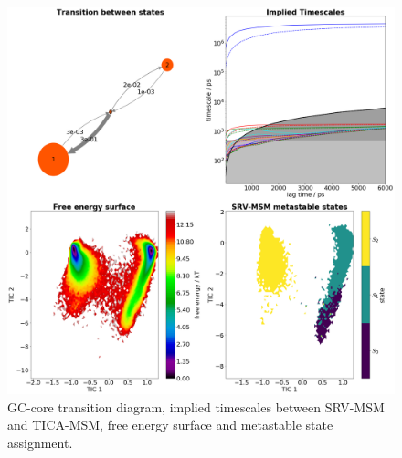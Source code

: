 \documentclass[journal=jpcbfk,manuscript=article]{achemso}
\begin{document}
\begin{figure}[ht!]
	\begin{center}
        \includegraphics[width=\textwidth]{Figs/skeleton/GC-core_vis.png}
        \caption{GC-core transition diagram, implied timescales between SRV-MSM and TICA-MSM, free energy surface and metastable state assignment.}
        \label{fig:sample_fray}
	\end{center}
\end{figure}

\clearpage
\newpage




\clearpage
\end{document}
